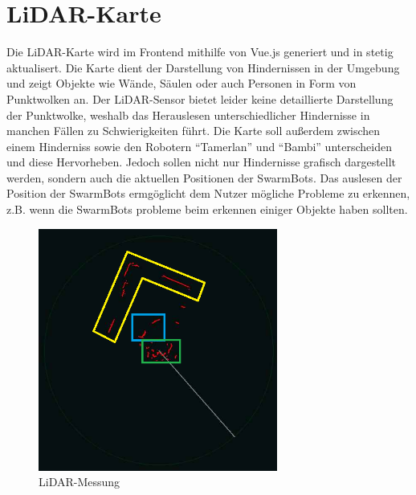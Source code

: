 \section{LiDAR-Karte}
\label{subsec:frontend_lidar_map}
Die LiDAR-Karte wird im Frontend mithilfe von Vue.js generiert und in stetig aktualisert. 
Die Karte dient der Darstellung von Hindernissen in der Umgebung und zeigt Objekte wie Wände, 
Säulen oder auch Personen in Form von Punktwolken an. 
%
Der LiDAR-Sensor bietet leider keine detaillierte Darstellung der Punktwolke, 
weshalb das Herauslesen unterschiedlicher Hindernisse in manchen Fällen zu Schwierigkeiten führt. 
%
Die Karte soll außerdem zwischen einem Hinderniss sowie den Robotern ``Tamerlan'' und ``Bambi'' 
unterscheiden und diese Hervorheben. 
%
Jedoch sollen nicht nur Hindernisse grafisch dargestellt werden, 
sondern auch die aktuellen Positionen der SwarmBots.
%
Das auslesen der Position der SwarmBots ermgöglicht dem Nutzer mögliche Probleme zu erkennen, 
z.B. wenn die SwarmBots probleme beim erkennen einiger Objekte haben sollten.  

\begin{figure}[H]
    \includegraphics[width=0.7\textwidth, center]{img/LiDARMessungZeichnung_alt.png}
    \caption{LiDAR-Messung}
    \label{fig:LiDAR-Messung}
\end{figure}

